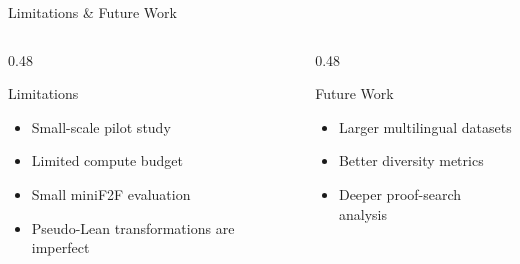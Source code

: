 \documentclass[aspectratio=169]{beamer}
\begin{document}
\begin{frame}{Limitations \& Future Work}

\centering

\vspace{0.45cm}

\begin{columns}[T,onlytextwidth]

\begin{column}{0.48\textwidth}

\begin{block}{Limitations}

\vspace{0.15cm}

\begin{itemize}
    \item Small-scale pilot study
    \vspace{0.18cm}

    \item Limited compute budget
    \vspace{0.18cm}

    \item Small miniF2F evaluation
    \vspace{0.18cm}

    \item Pseudo-Lean transformations are imperfect
\end{itemize}

\end{block}

\end{column}

\begin{column}{0.48\textwidth}

\begin{block}{Future Work}

\vspace{0.15cm}

\begin{itemize}
    \item Larger multilingual datasets
    \vspace{0.18cm}

    \item Better diversity metrics
    \vspace{0.18cm}

    \item Deeper proof-search analysis
    \vspace{0.18cm}


\end{itemize}
\end{block}
\end{column}
\end{columns}
\end{frame}
\end{document}
